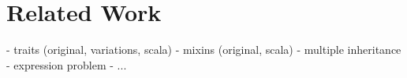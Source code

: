 \section{Related Work}\label{sec:related}

- traits (original, variations, scala)
- mixins (original, scala)
- multiple inheritance
- expression problem
- ...